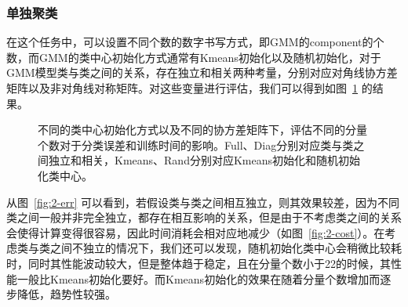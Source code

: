 \documentclass[UTF8]{ctexart}
\begin{document}
\subsubsection{单独聚类}

在这个任务中，可以设置不同个数的数字书写方式，即GMM的component的个数，而GMM的类中心初始化方式通常有Kmeans初始化以及随机初始化，对于GMM模型类与类之间的关系，存在独立和相关两种考量，分别对应对角线协方差矩阵以及非对角线对称矩阵。对这些变量进行评估，我们可以得到如图~\ref{fig:2-contrast} 的结果。

\begin{figure}[!h]
  \centering
  \quad  
  \caption{不同的类中心初始化方式以及不同的协方差矩阵下，评估不同的分量个数对于分类误差和训练时间的影响。Full、Diag分别对应类与类之间独立和相关，Kmeans、Rand分别对应Kmeans初始化和随机初始化类中心。}\label{fig:2-contrast}
\end{figure}

从图~\ref{fig:2-err} 可以看到，若假设类与类之间相互独立，则其效果较差，因为不同类之间一般并非完全独立，都存在相互影响的关系，但是由于不考虑类之间的关系会使得计算变得很容易，因此时间消耗会相对应地减少（如图~\ref{fig:2-cost}）。在考虑类与类之间不独立的情况下，我们还可以发现，随机初始化类中心会稍微比较耗时，同时其性能波动较大，但是整体趋于稳定，且在分量个数小于22的时候，其性能一般比Kmeans初始化要好。而Kmeans初始化的效果在随着分量个数增加而逐步降低，趋势性较强。
\end{document}
